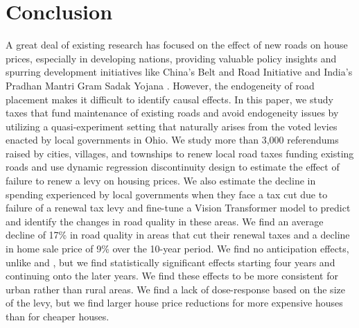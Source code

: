 


\section{Conclusion} \label{sec:conclusion}

A great deal of existing research has focused on the effect of new roads on house prices, especially in developing nations, providing valuable policy insights and spurring development initiatives like China’s Belt \citep{huang2016understanding} and Road Initiative and India’s Pradhan Mantri Gram Sadak Yojana \citep{asher2020}. However, the endogeneity of road placement makes it difficult to identify causal effects. In this paper, we study taxes that fund maintenance of existing roads and avoid endogeneity issues by utilizing a quasi-experiment setting that naturally arises from the voted levies enacted by local governments in Ohio. We study more than 3,000 referendums raised by cities, villages, and townships to renew local road taxes funding existing roads and use dynamic regression discontinuity design to estimate the effect of failure to renew a levy on housing prices. We also estimate the decline in spending experienced by local governments when they face a tax cut due to failure of a renewal tax levy and fine-tune a Vision Transformer model to predict and identify the changes in road quality in these areas. We find an average decline of 17\% in road quality in areas that cut their renewal taxes and a decline in home sale price of 9\% over the 10-year period. We find no anticipation effects, unlike \cite{beenstock2016hedonic} and \cite{diao2017spatial}, but we find statistically significant effects starting four years and continuing onto the later years. We find these effects to be more consistent for urban rather than rural areas. We find a lack of dose-response based on the size of the levy, but we find larger house price reductions for more expensive houses than for cheaper houses.  

